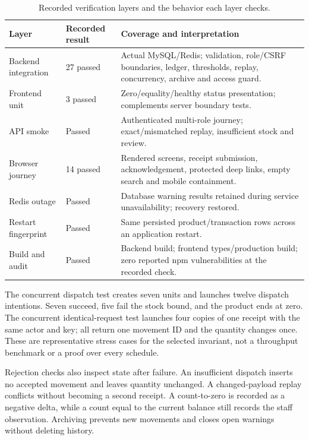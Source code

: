 \begin{table}[htbp]\centering\small
\caption{Recorded verification layers and the behavior each layer checks.}\label{tab:testresults}
\begin{tabularx}{\textwidth}{p{}p{}Y}\toprule
Layer & Recorded result & Coverage and interpretation \\\midrule
Backend integration & 27 passed & Actual MySQL/Redis; validation, role/CSRF boundaries, ledger, thresholds, replay, concurrency, archive and access guard. \\
Frontend unit & 3 passed & Zero/equality/healthy status presentation; complements server boundary tests. \\
API smoke & Passed & Authenticated multi-role journey; exact/mismatched replay, insufficient stock and review. \\
Browser journey & 14 passed & Rendered screens, receipt submission, acknowledgement, protected deep links, empty search and mobile containment. \\
Redis outage & Passed & Database warning results retained during service unavailability; recovery restored. \\
Restart fingerprint & Passed & Same persisted product/transaction rows across an application restart. \\
Build and audit & Passed & Backend build; frontend types/production build; zero reported npm vulnerabilities at the recorded check. \\\bottomrule
\end{tabularx}\end{table}

The concurrent dispatch test creates seven units and launches twelve dispatch intentions. Seven succeed, five fail the stock bound, and the product ends at zero. The concurrent identical-request test launches four copies of one receipt with the same actor and key; all return one movement ID and the quantity changes once. These are representative stress cases for the selected invariant, not a throughput benchmark or a proof over every schedule.

Rejection checks also inspect state after failure. An insufficient dispatch inserts no accepted movement and leaves quantity unchanged. A changed-payload replay conflicts without becoming a second receipt. A count-to-zero is recorded as a negative delta, while a count equal to the current balance still records the staff observation. Archiving prevents new movements and closes open warnings without deleting history.

